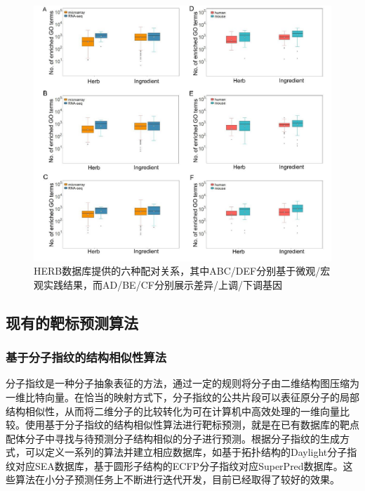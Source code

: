 \begin{figure}[H]
  \centering
  \includegraphics[width=\linewidth]{figures/HERB.png}
  \caption{HERB数据库提供的六种配对关系，其中ABC/DEF分别基于微观/宏观实践结果，而AD/BE/CF分别展示差异/上调/下调基因\cite{Fang_Dong_Liu_Guo_Zhao_Zhang_Bu_Liu_Huo_Cao_et_al._2021}}
  \label{fig:HERB}
\end{figure}

\subsection{现有的靶标预测算法}

\subsubsection{基于分子指纹的结构相似性算法}

分子指纹是一种分子抽象表征的方法，通过一定的规则将分子由二维结构图压缩为一维比特向量。在恰当的映射方式下，分子指纹的公共片段可以表征原分子的局部结构相似性，从而将二维分子的比较转化为可在计算机中高效处理的一维向量比较。使用基于分子指纹的结构相似性算法进行靶标预测，就是在已有数据库的靶点配体分子中寻找与待预测分子结构相似的分子进行预测。根据分子指纹的生成方式，可以定义一系列的算法并建立相应数据库，如基于拓扑结构的Daylight分子指纹对应SEA数据库\cite{Keiser_Roth_Armbruster_Ernsberger_Irwin_Shoichet_2007}，基于圆形子结构的ECFP分子指纹对应SuperPred数据库\cite{Nickel_Gohlke_Erehman_Banerjee_Rong_Goede_Dunkel_Preissner_2014}。这些算法在小分子预测任务上不断进行迭代开发，目前已经取得了较好的效果。

